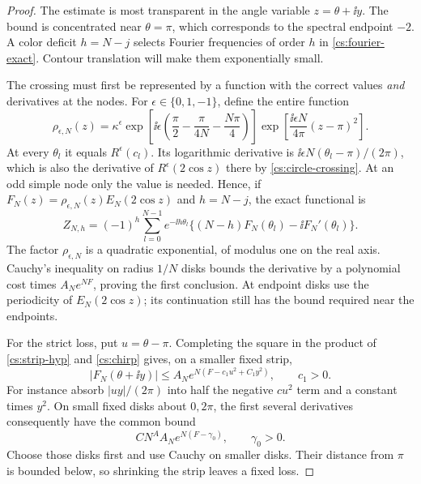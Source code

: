 \begin{proof}
The estimate is most transparent in the angle variable
$z=\theta+\ii y$. The bound is concentrated near $\theta=\pi$, which
corresponds to the spectral endpoint $-2$. A color deficit $h=N-j$
selects Fourier frequencies of order $h$ in \eqref{cs:fourier-exact}.
Contour translation will make them exponentially small.

The crossing must first be represented by a function with the correct
values \emph{and} derivatives at the nodes.
For \(\epsilon\in\{0,1,-1\}\), define the entire function
\begin{equation}\label{cs:chirp}
 \rho_{\epsilon,N}(z)=\kappa^\epsilon
  \exp\!\left[\ii\epsilon
       \left(\frac\pi2-\frac\pi{4N}-\frac{N\pi}4\right)\right]
  \exp\!\left[\frac{\ii\epsilon N}{4\pi}(z-\pi)^2\right].
\end{equation}
At every \(\theta_l\) it equals \(R^\epsilon(c_l)\). Its logarithmic
derivative is \(\ii\epsilon N(\theta_l-\pi)/(2\pi)\), which is also
the derivative of \(R^\epsilon(2\cos z)\) there by
\eqref{cs:circle-crossing}. At an odd simple node only the value is
needed. Hence, if
\(F_N(z)=\rho_{\epsilon,N}(z)E_N(2\cos z)\) and \(h=N-j\), the exact
functional is
\begin{equation}\label{cs:chirp-sampling}
 Z_{N,h}=(-1)^h\sum_{l=0}^{N-1}e^{-\ii h\theta_l}
          \{(N-h)F_N(\theta_l)-\ii F_N'(\theta_l)\}.
\end{equation}
The factor $\rho_{\epsilon,N}$ is a quadratic exponential, of modulus one on the real axis. Cauchy's inequality on radius
\(1/N\) disks bounds the derivative by a polynomial cost times
\(A_Ne^{NF}\), proving the first conclusion. At endpoint disks use
the periodicity of \(E_N(2\cos z)\); its continuation still has the
bound required near the endpoints.

For the strict loss, put \(u=\theta-\pi\). Completing the square in
the product of \eqref{cs:strip-hyp} and \eqref{cs:chirp} gives, on a
smaller fixed strip,
\begin{equation}\label{cs:chirp-envelope}
 |F_N(\theta+\ii y)|
    \le A_N e^{N(F-c_1u^2+C_1y^2)},\qquad c_1>0.
\end{equation}
For instance absorb \(|uy|/(2\pi)\) into half the negative
\(cu^2\) term and a constant times \(y^2\). On small fixed disks
about \(0,2\pi\), the first several derivatives consequently have
the common bound
\begin{equation}\label{cs:endpoint-gap}
 C N^A A_N e^{N(F-\gamma_0)},\qquad \gamma_0>0.
\end{equation}
Choose those disks first and use Cauchy on smaller disks. Their
distance from \(\pi\) is bounded below, so shrinking the strip leaves
a fixed loss.


\end{proof}
